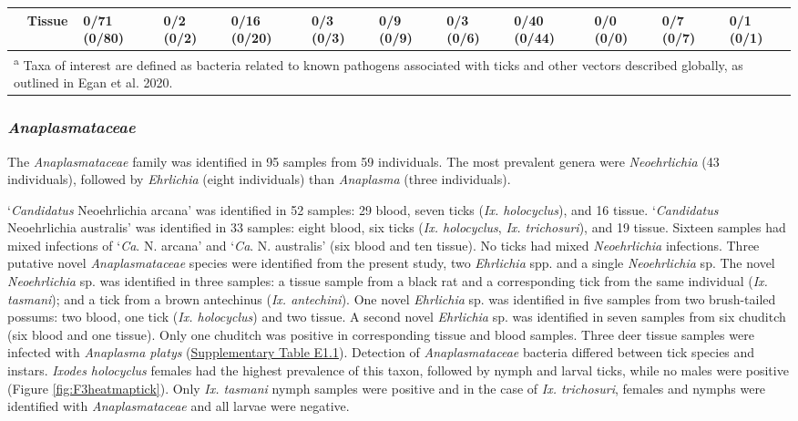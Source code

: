 \documentclass[a4paper, nobind]{templates/ociamthesis}
\begin{document}
\begin{landscape}
\begin{table}
\begin{tabular}[t]{>{}l>{}lllllllllll}
\em{} & \textbf{Tissue} & 0/71 (0/80) & 0/2 (0/2) & 0/16 (0/20) & 0/3 (0/3) & 0/9 (0/9) & 0/3 (0/6) & 0/40 (0/44) & 0/0 (0/0) & 0/7 (0/7) & 0/1 (0/1)\\
\bottomrule
\multicolumn{12}{l}{\rule{0pt}{1em}\textsuperscript{a} Taxa of interest are defined as bacteria related to known pathogens associated with ticks and other vectors described globally, as outlined in Egan et al. 2020.}\\
\end{tabular}
\end{table}
\end{landscape}

\hypertarget{anaplasmataceae-1}{%
\subsubsection{\texorpdfstring{\emph{Anaplasmataceae}}{Anaplasmataceae}}\label{anaplasmataceae-1}}

The \emph{Anaplasmataceae} family was identified in 95 samples from 59 individuals.
The most prevalent genera were \emph{Neoehrlichia} (43 individuals), followed by \emph{Ehrlichia} (eight individuals) than \emph{Anaplasma} (three individuals).

`\emph{Candidatus} Neoehrlichia arcana' was identified in 52 samples: 29 blood, seven ticks (\emph{Ix. holocyclus}), and 16 tissue. `\emph{Candidatus} Neoehrlichia australis' was identified in 33 samples: eight blood, six ticks (\emph{Ix. holocyclus}, \emph{Ix. trichosuri}), and 19 tissue.
Sixteen samples had mixed infections of `\emph{Ca}. N. arcana' and `\emph{Ca}. N. australis' (six blood and ten tissue).
No ticks had mixed \emph{Neoehrlichia} infections.
Three putative novel \emph{Anaplasmataceae} species were identified from the present study, two \emph{Ehrlichia} spp. and a single \emph{Neoehrlichia} sp.
The novel \emph{Neoehrlichia} sp. was identified in three samples: a tissue sample from a black rat and a corresponding tick from the same individual (\emph{Ix. tasmani}); and a tick from a brown antechinus (\emph{Ix. antechini}).
One novel \emph{Ehrlichia} sp. was identified in five samples from two brush-tailed possums: two blood, one tick (\emph{Ix. holocyclus}) and two tissue.
A second novel \emph{Ehrlichia} sp. was identified in seven samples from six chuditch (six blood and one tissue). Only one chuditch was positive in corresponding tissue and blood samples.
Three deer tissue samples were infected with \emph{Anaplasma platys} (\protect\hyperlink{supplementary-table-e1.1}{Supplementary Table E1.1}).
Detection of \emph{Anaplasmataceae} bacteria differed between tick species and instars.
\emph{Ixodes holocyclus} females had the highest prevalence of this taxon, followed by nymph and larval ticks, while no males were positive (Figure \ref{fig:F3heatmaptick}).
Only \emph{Ix. tasmani} nymph samples were positive and in the case of \emph{Ix. trichosuri}, females and nymphs were identified with \emph{Anaplasmataceae} and all larvae were negative.
\end{document}

